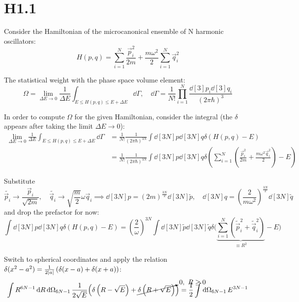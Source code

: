 \documentclass[11pt,a4paper]{scrartcl}
\begin{document}
\section*{H1.1}

Consider the Hamiltonian of the microcanonical ensemble of N harmonic oscillators:
\begin{equation*}
    H(p, q) = \sum_{i=1}^{N}\frac{\vec{p}_i^2}{2m} +
    \frac{m\omega^2}{2}\sum_{i=1}^{N}\vec{q}_i^2
\end{equation*}

The statistical weight with the phase space volume element:
\begin{equation*}
    \Omega = \lim_{\Delta E \to 0}\frac{1}{\Delta E} \int_{E\leq H(p,q)\leq
    E+\Delta E}\dd\Gamma, \quad
    \dd\Gamma = \frac{1}{N!}\prod_{i=1}^{N}\frac{\dd[3]p_i\dd[3]q_i}{(2\pi\hbar)^{3}}
\end{equation*}

In order to compute $\Omega$ for the given Hamiltonian, consider the
integral (the $\delta$ appears after taking the limit $\Delta E \to 0$):
\begin{align*}
    \lim_{\Delta E \to 0}\frac{1}{\Delta E}\int_{E\leq H(p,q)\leq E+\Delta E}\dd\Gamma &=
    \frac{1}{N!}\frac{1}{(2\pi\hbar)^{3N}}\int\dd[3N]{p}\dd[3N]{q}
    \delta\left(H(p,q)-E\right) \\
    &= \frac{1}{N!}\frac{1}{(2\pi\hbar)^{3N}}\int\dd[3N]{p}\dd[3N]{q}
    \delta\left(\sum_{i=1}^{N}\left(\frac{\vec{p}_i^2}{2m}+\frac{m\omega^2\vec{q}_i^2}{2}\right)-E\right)
\end{align*}

Substitute
\begin{equation*}
    \widetilde{\vec{p}_i}\longrightarrow\frac{\vec{p}_i}{\sqrt{2m}}, \quad
    \widetilde{\vec{q}_i}\longrightarrow\sqrt{\frac{m}{2}}\omega\vec{q}_i
    \implies \dd[3N]{p} = \left(2m\right)^{\frac{3N}{2}}\dd[3N]{\widetilde{p}},
    \quad \dd[3N]{q} = \left(\frac{2}{m\omega^2}\right)^{\frac{3N}{2}}\dd[3N]{\widetilde{q}}
\end{equation*}
and drop the prefactor for now:
\begin{equation*}
    \int\dd[3N]{p}\dd[3N]{q}\delta\left(H(p,q)-E\right) =
    \left(\frac{2}{\omega}\right)^{3N}
    \int\dd[3N]{\widetilde{p}}\dd[3N]{\widetilde{q}}
    \delta\Bigg(
    \underbrace{\sum_{i=1}^{N}\left(\widetilde{\vec{p}}_i^2+\widetilde{\vec{q}}_i^2\right)}_{\equiv R^2}
    -E\Bigg)
\end{equation*}

Switch to spherical coordinates and apply the relation
$\delta(x^2-a^2)=\frac{1}{2\abs{a}}\left(\delta(x-a)+\delta(x+a)\right)$:
\begin{equation*}
    \int R^{6N-1}\dd{R}\dd{\Omega_{6N-1}}\frac{1}{2\sqrt{E}}\Big(\delta\left(R-\sqrt{E}\right)
    +\cancelto{0,\ R\geq 0}{\delta\left(R+\sqrt{E}\right)}\Big)
    = \frac{1}{2}\int\dd{\Omega_{6N-1}}E^{3N-1}
\end{equation*}
\end{document}
